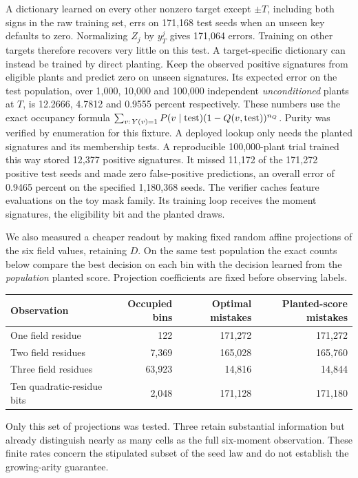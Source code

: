 \documentclass[11pt]{article}
\begin{document}
A dictionary learned on every other nonzero target except $\pm T$,
including both signs in the raw training set, errs on 171,168 test
seeds when an unseen key defaults to zero. Normalizing $Z_j$ by $y_T^j$
gives 171,064 errors. Training on other targets therefore recovers very
little on this test. A target-specific dictionary can instead be trained
by direct planting. Keep the observed positive signatures from eligible
plants and predict zero on unseen signatures. Its expected error on the
test population, over 1,000, 10,000 and 100,000 independent
\emph{unconditioned} plants at $T$, is 12.2666, 4.7812 and 0.9555
percent respectively. These numbers use the exact occupancy formula
$\sum_{v:\,Y(v)=1}P(v\mid{\rm test})(1-Q(v,{\rm test}))^{n_Q}$.
Purity was verified by enumeration for this fixture. A deployed lookup
only needs the planted signatures and its membership tests.
A reproducible 100,000-plant trial trained this way stored 12,377
positive signatures. It missed 11,172 of the 171,272 positive test
seeds and made zero false-positive predictions, an overall error of
0.9465 percent on the specified 1,180,368 seeds. The verifier caches
feature evaluations on the toy mask family. Its training loop receives
the moment signatures, the eligibility bit and the planted draws.

We also measured a cheaper readout by making fixed random affine
projections of the six field values, retaining $D$. On the same test
population the exact counts below compare the best decision on each bin
with the decision learned from the \emph{population} planted score.
Projection coefficients are fixed before observing labels.
\begin{center}
\begin{tabular}{lrrr}
\toprule
Observation & Occupied bins & Optimal mistakes & Planted-score mistakes\\
\midrule
One field residue & 122 & 171,272 & 171,272\\
Two field residues & 7,369 & 165,028 & 165,760\\
Three field residues & 63,923 & 14,816 & 14,844\\
Ten quadratic-residue bits & 2,048 & 171,128 & 171,180\\
\bottomrule
\end{tabular}
\end{center}
Only this set of projections was tested. Three retain substantial
information but already distinguish nearly as many cells as the full
six-moment observation. These finite rates concern the stipulated subset
of the seed law and do not establish the growing-arity guarantee.
\end{document}
